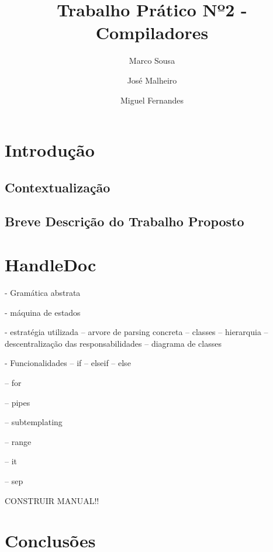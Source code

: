 \documentclass[runningheads]{llncs}
\begin{document}
%
\title{Trabalho Prático Nº2 - Compiladores}
%
%
\author{Marco Sousa \and
José Malheiro \and
Miguel Fernandes}
%
%
\maketitle              %
%
\begin{abstract}

\end{abstract}
%
%
%
\section{Introdução}
\subsection{Contextualização} 



\subsection{Breve Descrição do Trabalho Proposto}



\section{HandleDoc}
- Gramática abstrata

- máquina de estados

- estratégia utilizada
-- arvore de parsing concreta
-- classes
-- hierarquia
-- descentralização das responsabilidades
-- diagrama de classes

- Funcionalidades
-- if 
-- elseif
-- else 

-- for

-- pipes

-- subtemplating

-- range

-- it 

-- sep 

CONSTRUIR MANUAL!!

\section{Conclusões}
\end{document}
